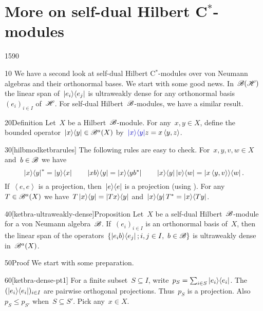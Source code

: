 \section{More on self-dual Hilbert C$^*$-modules}
\begin{parsec}{1590}%
\begin{point}{10}%
We have a second look at
    self-dual Hilbert C$^*$-modules over von Neumann algebras
    and their orthonormal bases.
We start with some good news.
In~$\mathscr{B}(\mathscr{H})$ the linear span of~$\left|e_i\right>\!\left<e_j\right|$
    is ultraweakly dense for any orthonormal basis~$(e_i)_{i \in I}$
    of~$\mathscr{H}$.
For self-dual Hilbert~$\mathscr{B}$-modules, we have a similar result.
\end{point}
\begin{point}{20}{Definition}%
Let~$X$ be a Hilbert~$\mathscr{B}$-module.
For any~$x, y \in X$,
define the bounded operator~$\left|x\right>\!\left<y\right| \in \mathscr{B}^a(X)$
by~$\Define{\ketbra{x}{y}}\index{*ketbra@$\ketbra{x}{y}$ for Hilbert $\scrB$-modules} z = x \left<y,z\right>$.
\begin{point}{30}[hilbmodketbrarules]%
The following rules are easy to check.
For~$x,y,v,w \in X$ and~$b \in \mathscr{B}$
    we have
\begin{equation*}
\left|x\right>\!\left<y\right|^* = \left|y\right>\!\left<x\right| \qquad
\left|xb\right>\!\left<y\right| = \left|x\right>\!\left<yb^*\right| \qquad
\left|x\right>\!\left<y\right| \left|v\right>\!\left<w\right| = \left|x\left<y,v\right>\right>\!\left<w\right|.
\end{equation*}
If~$\left<e,e\right>$ is a projection,
    then~$\left|e\right>\!\left<e\right|$ is a projection
    (using ).
For any~$T \in \mathscr{B}^a(X)$
    we have~$T \left|x\right>\!\left<y\right| = \left|Tx\right>\!\left<y\right|$
    and~$\left|x\right>\!\left<y\right|T^* = \left|x\right>\!\left<Ty\right|$.
\end{point}
\end{point}
\begin{point}{40}[ketbra-ultraweakly-dense]{Proposition}%
Let~$X$ be a self-dual Hilbert~$\mathscr{B}$-module
    for a von Neumann algebra~$\mathscr{B}$.
If~$(e_i)_{i \in I}$ is an orthonormal basis of~$X$,
then the linear span of
    the operators~$\{ \left|e_i b\right>\!\left<e_j\right|; i,j \in I, \ b \in \mathscr{B}\}$
    is ultraweakly dense in~$\mathscr{B}^a(X)$.
\begin{point}{50}{Proof}%
We start with some preparation.
\begin{point}{60}[ketbra-dense-pt1]%
For a finite subset~$S \subseteq I$,
    write~$p_S = \sum_{i \in S} \left|e_i\right>\!\left<e_i\right|$.
The~$(\left|e_i\right>\!\left<e_i\right|)_{i \in I}$ are pairwise orthogonal projections.
Thus~$p_S$ is a projection.
Also $p_S \leq p_{S'}$ when~$S \subseteq S'$.
Pick any~$x \in X$.

\end{point}
\end{point}
\end{point}
\end{parsec}
